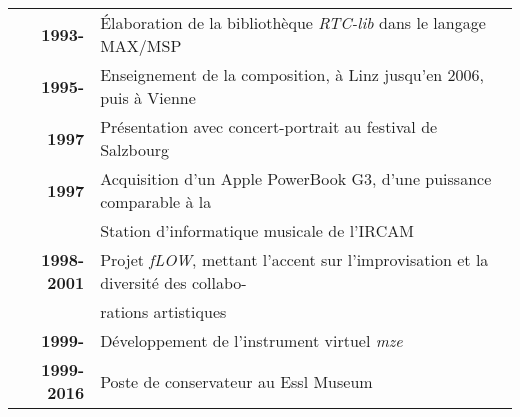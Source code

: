 \documentclass[a4paper,12pt]{article}
\newcommand{\maze}[0]{\emph{m\symbol{64}ze\textdegree2}}
\begin{document}
\begin{tabular}{rl}
\textbf{1993-} & Élaboration de la bibliothèque \emph{RTC-lib} dans le langage MAX/MSP \\
\textbf{1995-} & Enseignement de la composition, à Linz jusqu'en 2006, puis à Vienne \\
\textbf{1997} & Présentation avec concert-portrait au festival de Salzbourg \\
\textbf{1997} & Acquisition d'un Apple PowerBook G3, d'une puissance comparable à la \\ & Station d'informatique musicale de l'IRCAM \\
\textbf{1998-2001} & Projet \emph{fLOW}, mettant l'accent sur l'improvisation et la diversité des collabo- \\ & rations artistiques \\
\textbf{1999-} & Développement de l'instrument virtuel \maze \\
\textbf{1999-2016} & Poste de conservateur au Essl Museum
\end{tabular}
\end{document}
